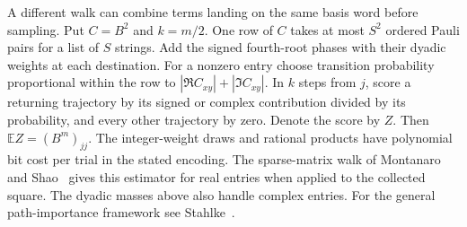 \documentclass[11pt]{article}
\begin{document}
A different walk can combine terms landing on the same basis word before sampling. Put \(C=B^2\) and \(k=m/2\). One row of \(C\) takes at most \(S^2\) ordered Pauli pairs for a list of \(S\) strings. Add the signed fourth-root phases with their dyadic weights at each destination. For a nonzero entry choose transition probability proportional within the row to \(|\Re C_{xy}|+|\Im C_{xy}|\). In \(k\) steps from \(j\), score a returning trajectory by its signed or complex contribution divided by its probability, and every other trajectory by zero. Denote the score by \(Z\). Then \(\mathbb E Z=(B^m)_{jj}\). The integer-weight draws and rational products have polynomial bit cost per trial in the stated encoding. The sparse-matrix walk of Montanaro and Shao~\cite[arXiv version, Prop.~5.5]{ms} gives this estimator for real entries when applied to the collected square. The dyadic masses above also handle complex entries. For the general path-importance framework see Stahlke~\cite{stahlke}.
\end{document}
